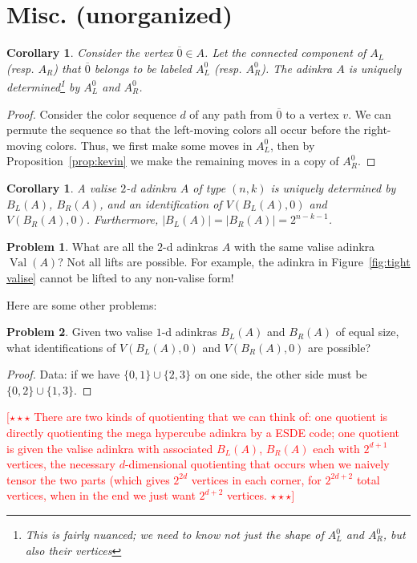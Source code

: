 \documentclass[12pt,twoside,singlespace]{article}
\numberwithin{equation}{section}
\newtheorem{cor}[equation]{Corollary}
\theoremstyle{definition}
\newtheorem{prob}{Problem}
\newcommand{\on}{\operatorname}
\newcommand{\val}{\on{Val}}
\newcommand{\com}[1]{\textcolor{red}{$[\star \star \star$ #1 $\star \star \star]$}}
\begin{document}
\section{Misc. (unorganized)}

\begin{cor}
\label{cor:factorization-connected-components}
Consider the vertex $\overline{0} \in A$. Let the connected component of $A_L$ (resp. $A_R$) that $\overline{0}$ belongs to be labeled $A_L^0$ (resp. $A_R^0$). The adinkra $A$ is uniquely determined\footnote{This is fairly nuanced; we need to know not just the shape of $A_L^0$ and $A_R^0$, but also their vertices} by $A_L^0$ and $A_R^0$.
\end{cor}
\begin{proof}
Consider the color sequence $d$ of any path from $\overline{0}$ to a vertex $v$. We can permute the sequence so that the left-moving colors all occur before the right-moving colors. Thus, we first make some moves in $A_L^0$, then by Proposition~\ref{prop:kevin} we make the remaining moves in a copy of $A_R^0$. 
\end{proof}


\begin{cor}
\label{cor:valise factorization}
A valise $2$-d adinkra $A$ of type $(n,k)$ is uniquely determined by $B_L(A)$, $B_R(A)$, and an identification of $V(B_L(A), 0)$ and $V(B_R(A), 0)$. Furthermore, $|B_L(A)| = |B_R(A)| = 2^{n-k-1}$.
\end{cor}


\begin{prob}
What are all the $2$-d adinkras $A$ with the same valise adinkra $\val(A)$? Not all lifts are possible. For example, the adinkra in Figure~\ref{fig:tight valise} cannot be lifted to any non-valise form!
\end{prob}





Here are some other problems:
\begin{prob}
Given two valise $1$-d adinkras $B_L(A)$ and $B_R(A)$ of equal size, what identifications of $V(B_L(A), 0)$ and $V(B_R(A), 0)$ are possible?
\end{prob}
\begin{proof}
Data: if we have $\{0,1\} \cup \{2,3\}$ on one side, the other side must be $\{0,2\} \cup \{1, 3\}$.
\end{proof}

\com{There are two kinds of quotienting that we can think of: one quotient is directly quotienting the mega hypercube adinkra by a ESDE code; one quotient is given the valise adinkra with associated $B_L(A)$, $B_R(A)$ each with $2^{d+1}$ vertices, the necessary $d$-dimensional quotienting that occurs when we naively tensor the two parts (which gives $2^{2d}$ vertices in each corner, for $2^{2d+2}$ total vertices, when in the end we just want $2^{d+2}$ vertices.}
\end{document}
